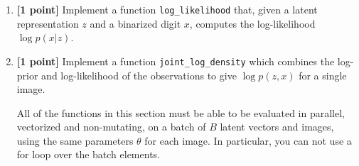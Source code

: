 \documentclass{article}
\begin{document}
\begin{enumerate}[label=(\alph*)]
	\item {\bf [1 point]} Implement a function \texttt{log\_likelihood} that, given a latent representation $z$ and a binarized digit $x$, computes the log-likelihood $\log p(x|z)$.
	
   \item {\bf [1 point]} Implement a function \texttt{joint\_log\_density} which combines the log-prior and log-likelihood of the observations to give $\log p(z, x)$ for a single image.
   
All of the functions in this section must be able to be evaluated in parallel, vectorized and non-mutating, on a batch of $B$ latent vectors and images, using the same parameters $\theta$ for each image.
In particular, you can not use a for loop over the batch elements.
  
\end{enumerate}

\pagebreak
\end{document}
